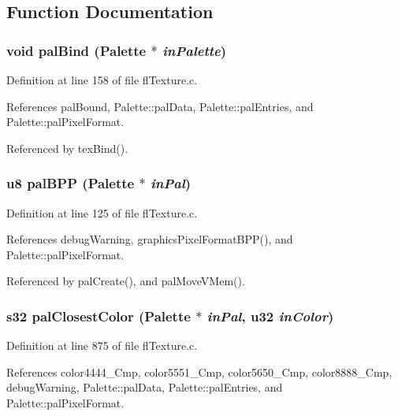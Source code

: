 \subsection{Function Documentation}
\subsubsection{\setlength{\rightskip}{0pt plus 5cm}void pal\-Bind ({\bf Palette} $\ast$ {\em in\-Palette})\hspace{0.3cm}{\tt  [inline]}}\label{flTexture_8c_41e78049fb4a6e9d9f866a67042d4d51}




Definition at line 158 of file fl\-Texture.c.

References pal\-Bound, Palette::pal\-Data, Palette::pal\-Entries, and Palette::pal\-Pixel\-Format.

Referenced by tex\-Bind().
\subsubsection{\setlength{\rightskip}{0pt plus 5cm}u8 pal\-BPP ({\bf Palette} $\ast$ {\em in\-Pal})\hspace{0.3cm}{\tt  [inline]}}\label{flTexture_8c_3bc371a87c5df314b09a477704d5ee24}




Definition at line 125 of file fl\-Texture.c.

References debug\-Warning, graphics\-Pixel\-Format\-BPP(), and Palette::pal\-Pixel\-Format.

Referenced by pal\-Create(), and pal\-Move\-VMem().
\subsubsection{\setlength{\rightskip}{0pt plus 5cm}s32 pal\-Closest\-Color ({\bf Palette} $\ast$ {\em in\-Pal}, u32 {\em in\-Color})}\label{flTexture_8c_57fa8eca9371b4c3bc52915f4e871ff8}




Definition at line 875 of file fl\-Texture.c.

References color4444\_\-Cmp, color5551\_\-Cmp, color5650\_\-Cmp, color8888\_\-Cmp, debug\-Warning, Palette::pal\-Data, Palette::pal\-Entries, and Palette::pal\-Pixel\-Format.
